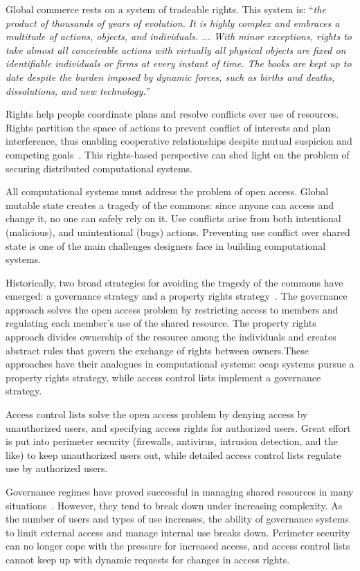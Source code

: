 \documentclass{llncs}
\begin{document}
Global commerce rests on a system of tradeable rights. This system is: ``\emph{the product of thousands of years of evolution. It is highly complex and embraces a multitude of actions, objects, and individuals. ... With minor exceptions, rights to take almost all conceivable actions with virtually all physical objects are fixed on identifiable individuals or firms at every instant of time. The books are kept up to date despite the burden imposed by dynamic forces, such as births and deaths, dissolutions, and new technology.}''~\cite{jensen_specific_1995}

Rights help people coordinate plans and resolve conflicts over use of resources. Rights partition the space of actions to prevent conflict of interests and plan interference, thus enabling cooperative relationships despite mutual suspicion and competing goals~\cite{steiner_essay_1994}. This rights-based perspective can shed light on the problem of securing distributed computational systems.

All computational systems must address the problem of open access. Global mutable state creates a tragedy of the commons: since anyone can access and change it, no one can safely rely on it. Use conflicts arise from both intentional (malicious), and unintentional (bugs) actions. Preventing use conflict over shared state is one of the main challenges designers face in building computational systems.

Historically, two broad strategies for avoiding the tragedy of the commons have emerged: a governance strategy and a property rights strategy~\cite{smith_exclusion_2002}. The governance approach solves the open access problem by restricting access to members and regulating each member's use of the shared resource. The property rights approach divides ownership of the resource among the individuals and creates abstract rules that govern the exchange of rights between owners.These approaches have their analogues in computational systems: ocap systems pursue a property rights strategy, while access control lists implement a governance strategy.

Access control lists solve the open access problem by denying access by unauthorized users, and specifying access rights for authorized users. Great effort is put into perimeter security (firewalls, antivirus, intrusion detection, and the like) to keep unauthorized users out, while detailed access control lists regulate use by authorized users.

Governance regimes have proved successful in managing shared resources in many situations~\cite{ostrom_governing_1990}. However, they tend to break down under increasing complexity. As the number of users and types of use increases, the ability of governance systems to limit external access and manage internal use breaks down. Perimeter security can no longer cope with the pressure for increased access, and access control lists cannot keep up with dynamic requests for changes in access rights.
\end{document}
